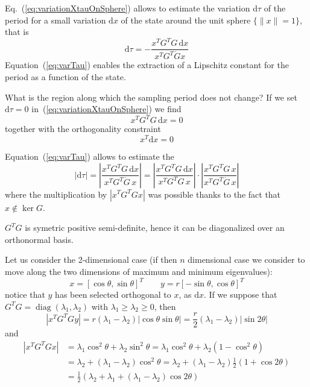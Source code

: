 \documentclass[12pt,draftcls,onecolumn]{IEEEtran} %
\newcommand{\ud}{\mathrm{d}}
\DeclareMathOperator{\diag}{diag}
\begin{document}
Eq.~(\ref{eq:variationXtauOnSphere}) allows to estimate the variation
$\ud\tau$ of the period for a small variation $\ud x$ of the state
around the unit sphere $\{\|x\|=1\}$, that is
\begin{equation}
  \label{eq:varTau}
  \ud\tau=-\frac{x^TG^TG\,\ud x}{x^TG^T\dot Gx}
\end{equation}
Equation~(\ref{eq:varTau}) enables the extraction of a Lipschitz
constant for the period as a function of the state.

What is the region along which the sampling period does not change? If
we set $\ud \tau=0$ in~(\ref{eq:variationXtauOnSphere}) we find
\begin{equation}
  \label{eq:varXsameTau}
  x^TG^TG\,\ud x =0
\end{equation}
together with the orthogonality constraint
\begin{equation}
  \label{eq:ortho}
  x^T\ud x=0
\end{equation}

Equation~(\ref{eq:varTau}) allows to estimate the
\begin{equation}
  \label{eq:MaxDtau}
  |\ud\tau|=\left|\frac{x^TG^TG\,\ud x}{x^TG^T\dot G\,x}\right|
  = \left|\frac{x^TG^TG\,\ud x}{x^TG^T G\,x}\right|\cdot
  \left|\frac{x^TG^TG\, x}{x^TG^T\dot G\,x}\right|
\end{equation}
where the multiplication by $|x^TG^TGx|$ was possible thanks to the
fact that $x\notin\ker G$.

$G^TG$ is symetric positive semi-definite, hence it can be
diagonalized over an orthonormal basis.

Let us consider the 2-dimensional case (if then $n$ dimensional case
we consider to move along the two dimensions of maximum and minimum
eigenvalues):
\begin{equation*}
  x = [\cos\theta, \sin\theta]^T
  \qquad
  y = r[-\sin\theta,\cos\theta]^T
\end{equation*}
notice that $y$ has been selected orthogonal to $x$, as $\ud x$. If we
suppose that $G^TG=\diag(\lambda_1,\lambda_2)$ with
$\lambda_1\geq\lambda_2\geq 0$, then
\begin{equation*}
  |x^TG^TGy|=r(\lambda_1-\lambda_2)|\cos\theta\sin\theta|
  =\frac r2(\lambda_1-\lambda_2)|\sin2\theta|
\end{equation*}
and
\begin{align*}
  |x^TG^TGx| & =\lambda_1\cos^2\theta+\lambda_2\sin^2\theta
  =\lambda_1\cos^2\theta+\lambda_2(1-\cos^2\theta) \\
  & = \lambda_2+(\lambda_1-\lambda_2)\cos^2\theta
  = \lambda_2+(\lambda_1-\lambda_2)\frac 12(1+\cos2\theta)\\
  & = \frac 12(\lambda_2+\lambda_1+(\lambda_1-\lambda_2)\cos2\theta)
\end{align*}
\end{document}
